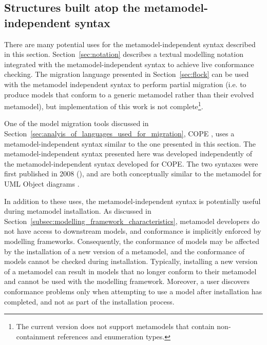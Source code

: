\subsection{Structures built atop the metamodel-independent syntax}
There are many potential uses for the metamodel-independent syntax described in this section. Section~\ref{sec:notation} describes a textual modelling notation integrated with the metamodel-independent syntax to achieve live conformance checking. The migration language presented in Section~\ref{sec:flock} can be used with the metamodel independent syntax to perform partial migration (i.e. to produce models that conform to a generic metamodel rather than their evolved metamodel), but implementation of this work is not complete\footnote{The current version does not support metamodels that contain non-containment references and enumeration types.}.

One of the model migration tools discussed in Section~\ref{sec:analyis_of_languages_used_for_migration}, COPE \cite{herrmannsdoerfer09cope}, uses a metamodel-independent syntax similar to the one presented in this section. The metamodel-independent syntax presented here was developed independently of the metamodel-independent syntax developed for COPE. The two syntaxes were first published in 2008 (\cite{rose08hutn,herrmannsdoerfer08cope}), and are both conceptually similar to the metamodel for UML Object diagrams \cite{uml14}.

In addition to these uses, the metamodel-independent syntax is potentially useful during metamodel installation. As discussed in Section~\ref{subsec:modelling_framework_characteristics}, metamodel developers do not have access to downstream models, and conformance is implicitly enforced by modelling frameworks. Consequently, the conformance of models may be affected by the installation of a new version of a metamodel, and the conformance of models cannot be checked during installation. Typically, installing a new version of a metamodel can result in models that no longer conform to their metamodel and cannot be used with the modelling framework. Moreover, a user discovers conformance problems only when attempting to use a model after installation has completed, and not as part of the installation process.


